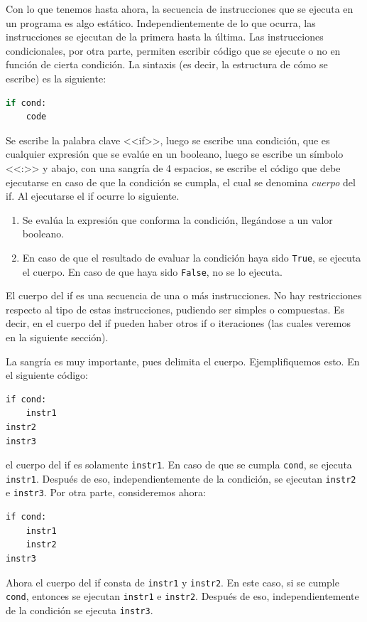 \documentclass[a4paper, 12pt]{report}
\theoremstyle{definition}
\begin{document}
Con lo que tenemos hasta ahora, la secuencia de instrucciones que se ejecuta en un programa es algo estático. Independientemente de lo que ocurra, las instrucciones se ejecutan de la primera hasta la última. Las instrucciones condicionales, por otra parte, permiten escribir código que se ejecute o no en función de cierta condición. La sintaxis (es decir, la estructura de cómo se escribe) es la siguiente:
\begin{lstlisting}[language=python]
if cond:
    code
\end{lstlisting}
Se escribe la palabra clave <<if>>, luego se escribe una condición, que es cualquier expresión que se evalúe en un booleano, luego se escribe un símbolo <<:>> y abajo, con una sangría de 4 espacios, se escribe el código que debe ejecutarse en caso de que la condición se cumpla, el cual se denomina {\sl cuerpo} del if. Al ejecutarse el if ocurre lo siguiente.
\begin{enumerate}
	\item Se evalúa la expresión que conforma la condición, llegándose a un valor booleano.
	\item En caso de que el resultado de evaluar la condición haya sido {\tt True}, se ejecuta el cuerpo. En caso de que haya sido {\tt False}, no se lo ejecuta.
\end{enumerate}

El cuerpo del if es una secuencia de una o más instrucciones. No hay restricciones respecto al tipo de estas instrucciones, pudiendo ser simples o compuestas. Es decir, en el cuerpo del if pueden haber otros if o iteraciones (las cuales veremos en la siguiente sección).

La sangría es muy importante, pues delimita el cuerpo. Ejemplifiquemos esto. En el siguiente código:
\begin{verbatim}
if cond:
    instr1
instr2
instr3
\end{verbatim}
el cuerpo del if es solamente {\tt instr1}. En caso de que se cumpla {\tt cond}, se ejecuta {\tt instr1}. Después de eso, independientemente de la condición, se ejecutan {\tt instr2} e {\tt instr3}. Por otra parte, consideremos ahora:
\begin{verbatim}
if cond:
    instr1
    instr2
instr3
\end{verbatim}
Ahora el cuerpo del if consta de {\tt instr1} y {\tt instr2}. En este caso, si se cumple {\tt cond}, entonces se ejecutan {\tt instr1} e {\tt instr2}. Después de eso, independientemente de la condición se ejecuta {\tt instr3}.
\end{document}
